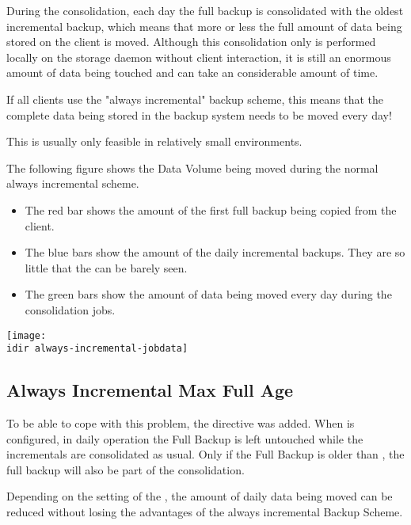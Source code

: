 During the consolidation, each day the full backup is consolidated with the oldest incremental backup, which means that more or less the full amount of data being stored on the client is moved.
Although this consolidation only is performed locally on the storage daemon without client interaction, it is still an enormous amount of data being touched and can take an considerable amount of time.

If all clients use the "always incremental" backup scheme, this means that the complete data being stored in the backup system needs to be moved every day!

This is usually only feasible in relatively small environments.

The following figure shows the Data Volume being moved during the normal always incremental scheme.
\begin{itemize}
    \item The red bar shows the amount of the first full backup being copied from the client.
    \item The blue bars show the amount of the daily incremental backups. They are so little that the can be barely seen.
    \item The green bars show the amount of data being moved every day during the consolidation jobs.
\end{itemize}

\begin{center}
\texttt{[image: \\idir always-incremental-jobdata]}
\end{center}



\subsection{Always Incremental Max Full Age}
\label{sec:AlwaysIncrementalMaxFullAge}

To be able to cope with this problem, the directive  was added.
When  is configured,
in daily operation the Full Backup is left untouched while the incrementals are consolidated as usual. 
Only if the Full Backup is older than ,
the full backup will also be part of the consolidation.

Depending on the setting of the ,
the amount of daily data being moved can be reduced without losing the advantages of the always incremental Backup Scheme.

